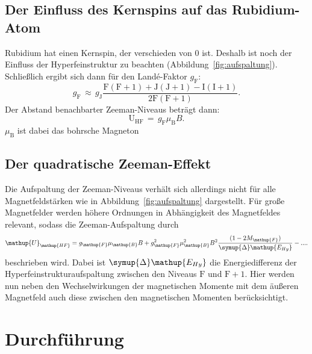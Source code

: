\documentclass[
  bibliography=totoc,     %
  captions=tableheading,  %
  titlepage=firstiscover, %
]{scrartcl}
\begin{document}
\subsection{Der Einfluss des Kernspins auf das Rubidium-Atom}
Rubidium hat einen Kernspin, der verschieden von 0 ist. Deshalb ist noch der Einfluss
der Hyperfeinstruktur zu beachten (Abbildung~\ref{fig:aufspaltung}).\\
Schließlich ergibt sich dann für den Landé-Faktor $g_{\mathup{F}}$:
\begin{equation}
  g_{\mathup{F}}\,\approx\,g_{\mathup{J}} \frac{\mathup{F}(\mathup{F}+1)+\mathup{J}(\mathup{J}+1)-\mathup{I}(\mathup{I}+1)}{2\mathup{F}(\mathup{F}+1)}.
  \label{eqn:gflande}
\end{equation}
Der Abstand benachbarter Zeeman-Niveaus beträgt dann:
\begin{equation}
  \mathup{U}_{\mathup{HF}}\,=\,g_{\mathup{F}}\mu_{\mathup{B}} B.
  \label{eqn:zeeman}
\end{equation}
$\mu_{\mathup{B}}$ ist dabei das bohrsche Magneton

\subsection{Der quadratische Zeeman-Effekt}
Die Aufspaltung der Zeeman-Niveaus verhält sich allerdings nicht für alle Magnetfeldstärken
wie in Abbildung~\ref{fig:aufspaltung} dargestellt. Für große Magnetfelder werden höhere
Ordnungen in Abhängigkeit des Magnetfeldes relevant, sodass die Zeeman-Aufspaltung durch
%
\begin{equation}
  \mathup{U}_{\mathup{HF}} = g_{\mathup{F}}\mu_{\mathup{B}}B + g_{\mathup{F}}^2\mu_{\mathup{B}}^2B^2\frac{(1-2M_{\mathup{F}})}{\symup{\Delta} \mathup{E_{Hy}}} - ....
  \label{eq:quad_zeeman}
\end{equation}
%
beschrieben wird. Dabei ist $\symup{\Delta} \mathup{E_{Hy}}$ die Energiedifferenz der
Hyperfeinstrukturaufspaltung zwischen den Niveaus $\mathup{F}$ und $\mathup{F}+1$.
Hier werden nun neben den Wechselwirkungen der magnetischen Momente mit dem äußeren
Magnetfeld auch diese zwischen den magnetischen Momenten berücksichtigt.

\section{Durchführung}
\label{sec:durchführung}
\end{document}

